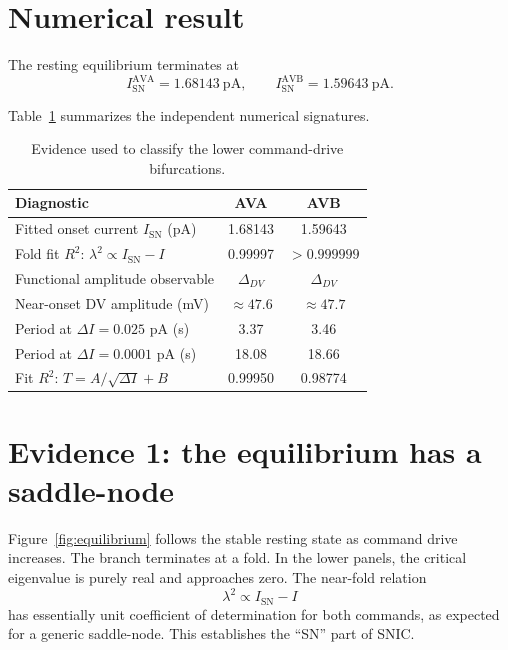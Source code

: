 \documentclass[11pt]{article}
\begin{document}
\section{Numerical result}

The resting equilibrium terminates at
\begin{equation}
\boxed{I_{\mathrm{SN}}^{\mathrm{AVA}}=1.68143\ \mathrm{pA}},
\qquad
\boxed{I_{\mathrm{SN}}^{\mathrm{AVB}}=1.59643\ \mathrm{pA}}.
\end{equation}

Table~\ref{tab:evidence} summarizes the independent numerical signatures.

\begin{table}[ht]
\centering
\caption{Evidence used to classify the lower command-drive bifurcations.}
\label{tab:evidence}
\renewcommand{\arraystretch}{1.18}
\begin{tabular}{@{}lcc@{}}
\toprule
Diagnostic & \textcolor{ava}{AVA} & \textcolor{avb}{AVB} \\
\midrule
Fitted onset current $I_{\mathrm{SN}}$ (pA) & 1.68143 & 1.59643 \\
Fold fit $R^2$: $\lambda^2\propto I_{\mathrm{SN}}-I$ & 0.99997 & $>0.999999$ \\
Functional amplitude observable & $\Delta_{DV}$ & $\Delta_{DV}$ \\
Near-onset DV amplitude (mV) & $\approx47.6$ & $\approx47.7$ \\
Period at $\Delta I=0.025$ pA (s) & 3.37 & 3.46 \\
Period at $\Delta I=0.0001$ pA (s) & 18.08 & 18.66 \\
Fit $R^2$: $T=A/\sqrt{\Delta I}+B$ & 0.99950 & 0.98774 \\
\bottomrule
\end{tabular}
\end{table}

\section{Evidence 1: the equilibrium has a saddle-node}

Figure~\ref{fig:equilibrium} follows the stable resting state as command drive
increases. The branch terminates at a fold. In the lower panels, the critical
eigenvalue is purely real and approaches zero. The near-fold relation
\begin{equation}
\lambda^2 \propto I_{\mathrm{SN}}-I
\end{equation}
has essentially unit coefficient of determination for both commands, as
expected for a generic saddle-node. This establishes the ``SN'' part of SNIC.
\end{document}
